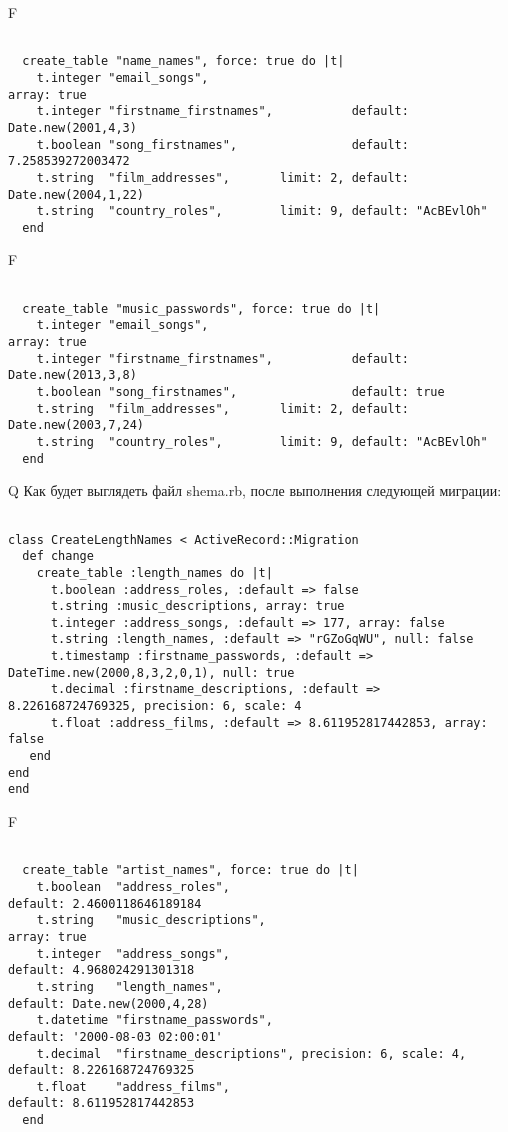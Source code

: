 F
\begin{verbatim}

  create_table "name_names", force: true do |t|
    t.integer "email_songs",                                         array: true
    t.integer "firstname_firstnames",           default: Date.new(2001,4,3)
    t.boolean "song_firstnames",                default: 7.258539272003472
    t.string  "film_addresses",       limit: 2, default: Date.new(2004,1,22)
    t.string  "country_roles",        limit: 9, default: "AcBEvlOh"
  end

\end{verbatim}

F
\begin{verbatim}

  create_table "music_passwords", force: true do |t|
    t.integer "email_songs",                                         array: true
    t.integer "firstname_firstnames",           default: Date.new(2013,3,8)
    t.boolean "song_firstnames",                default: true
    t.string  "film_addresses",       limit: 2, default: Date.new(2003,7,24)
    t.string  "country_roles",        limit: 9, default: "AcBEvlOh"
  end

\end{verbatim}

Q
Как будет выглядеть файл shema.rb, после выполнения следующей миграции:

\begin{verbatim}

class CreateLengthNames < ActiveRecord::Migration 
  def change 
    create_table :length_names do |t| 
      t.boolean :address_roles, :default => false
      t.string :music_descriptions, array: true
      t.integer :address_songs, :default => 177, array: false
      t.string :length_names, :default => "rGZoGqWU", null: false
      t.timestamp :firstname_passwords, :default => DateTime.new(2000,8,3,2,0,1), null: true
      t.decimal :firstname_descriptions, :default => 8.226168724769325, precision: 6, scale: 4
      t.float :address_films, :default => 8.611952817442853, array: false
   end
end
end
\end{verbatim}

F
\begin{verbatim}

  create_table "artist_names", force: true do |t|
    t.boolean  "address_roles",                                  default: 2.4600118646189184
    t.string   "music_descriptions",                                                                          array: true
    t.integer  "address_songs",                                  default: 4.968024291301318
    t.string   "length_names",                                   default: Date.new(2000,4,28)
    t.datetime "firstname_passwords",                            default: '2000-08-03 02:00:01'
    t.decimal  "firstname_descriptions", precision: 6, scale: 4, default: 8.226168724769325
    t.float    "address_films",                                  default: 8.611952817442853
  end

\end{verbatim}

